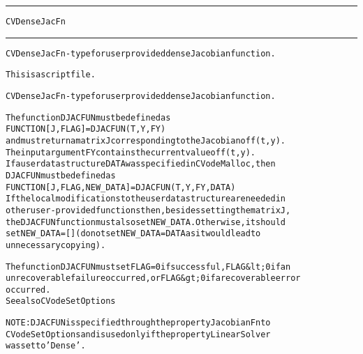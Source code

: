\begin{samepage}
\hrule
\begin{center}
{\large \verb!CVDenseJacFn!}
\label{p:CVDenseJacFn}
\end{center}
\hrule\vspace{0.1in}



\begin{alltt}
CVDenseJacFn - type for user provided dense Jacobian function.
\end{alltt}

\end{samepage}



\begin{samepage}


\begin{alltt}
This is a script file. 
\end{alltt}

\end{samepage}



\begin{alltt}
CVDenseJacFn - type for user provided dense Jacobian function.

   The function DJACFUN must be defined as 
        FUNCTION [J, FLAG] = DJACFUN(T, Y, FY)
   and must return a matrix J corresponding to the Jacobian of f(t,y).
   The input argument FY contains the current value of f(t,y).
   If a user data structure DATA was specified in CVodeMalloc, then
   DJACFUN must be defined as
        FUNCTION [J, FLAG, NEW_DATA] = DJACFUN(T, Y, FY, DATA)
   If the local modifications to the user data structure are needed in
   other user-provided functions then, besides setting the matrix J,
   the DJACFUN function must also set NEW_DATA. Otherwise, it should
   set NEW_DATA=[] (do not set NEW_DATA = DATA as it would lead to 
   unnecessary copying).

   The function DJACFUN must set FLAG=0 if successful, FLAG&lt;0 if an
   unrecoverable failure occurred, or FLAG&gt;0 if a recoverable error
   occurred.
   See also CVodeSetOptions

   NOTE: DJACFUN is specified through the property JacobianFn to
   CVodeSetOptions and is used only if the property LinearSolver
   was set to 'Dense'.
\end{alltt}






\vspace{0.1in}